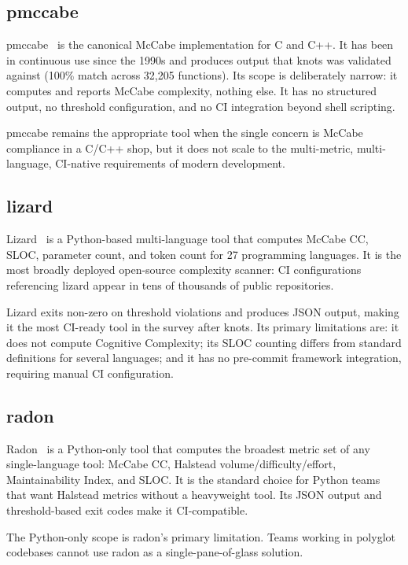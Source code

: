 \documentclass[10pt,twocolumn,letterpaper]{article}
\begin{document}
\subsection{pmccabe}

pmccabe~\cite{pmccabe} is the canonical McCabe implementation for C and C++.
It has been in continuous use since the 1990s and produces output that
knots was validated against (100\% match across 32,205 functions).  Its
scope is deliberately narrow: it computes and reports McCabe complexity,
nothing else.  It has no structured output, no threshold configuration, and
no CI integration beyond shell scripting.

pmccabe remains the appropriate tool when the single concern is McCabe
compliance in a C/C++ shop, but it does not scale to the multi-metric,
multi-language, CI-native requirements of modern development.

\subsection{lizard}

Lizard~\cite{lizard} is a Python-based multi-language tool that computes
McCabe CC, SLOC, parameter count, and token count for 27 programming
languages.  It is the most broadly deployed open-source complexity scanner:
CI configurations referencing lizard appear in tens of thousands of public
repositories.

Lizard exits non-zero on threshold violations and produces JSON output,
making it the most CI-ready tool in the survey after knots.  Its primary
limitations are: it does not compute Cognitive Complexity; its SLOC
counting differs from standard definitions for several languages; and it
has no pre-commit framework integration, requiring manual CI configuration.

\subsection{radon}

Radon~\cite{radon} is a Python-only tool that computes the broadest metric
set of any single-language tool: McCabe CC, Halstead volume/difficulty/effort,
Maintainability Index, and SLOC.  It is the standard choice for Python
teams that want Halstead metrics without a heavyweight tool.  Its JSON
output and threshold-based exit codes make it CI-compatible.

The Python-only scope is radon's primary limitation.  Teams working in
polyglot codebases cannot use radon as a single-pane-of-glass solution.
\end{document}
